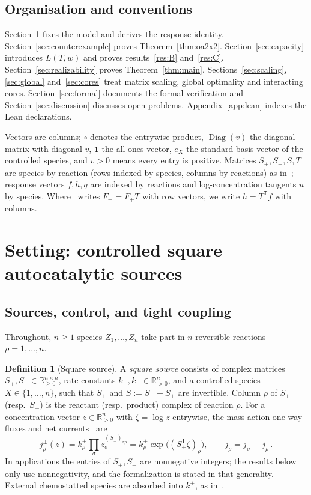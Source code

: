 \documentclass[11pt,reqno]{amsart}
\theoremstyle{plain}
\theoremstyle{definition}
\newtheorem{definition}[theorem]{Definition}
\theoremstyle{remark}
\numberwithin{equation}{section}
\newcommand{\R}{\mathbb{R}}
\newcommand{\one}{\mathbf{1}}
\newcommand{\Diag}{\operatorname{Diag}}
\newcommand{\Sp}{S_{+}}
\newcommand{\Sm}{S_{-}}
\newcommand{\T}{\mathsf{T}}
\renewcommand{\odot}{\circ}
\begin{document}
\subsection{Organisation and conventions}
Section~\ref{sec:setting} fixes the model and derives the response identity.  Section~\ref{sec:counterexample} proves Theorem~\ref{thm:oa2x2}.  Section~\ref{sec:capacity} introduces $L(T,w)$ and proves results~\ref{res:B} and~\ref{res:C}.  Section~\ref{sec:realizability} proves Theorem~\ref{thm:main}.  Sections~\ref{sec:scaling}, \ref{sec:global} and~\ref{sec:cores} treat matrix scaling, global optimality and interacting cores.  Section~\ref{sec:formal} documents the formal verification and Section~\ref{sec:discussion} discusses open problems.  Appendix~\ref{app:lean} indexes the Lean declarations.

Vectors are columns; $\odot$ denotes the entrywise product, $\Diag(v)$ the diagonal matrix with diagonal $v$, $\one$ the all-ones vector, $e_X$ the standard basis vector of the controlled species, and $v>0$ means every entry is positive.  Matrices $\Sp,\Sm,S,T$ are species-by-reaction (rows indexed by species, columns by reactions) as in~\cite{DDL24}; response vectors $f,h,q$ are indexed by reactions and log-concentration tangents $u$ by species.  Where~\cite{DDL24} writes $F_-=F_+T$ with row vectors, we write $h=T^{\T}f$ with columns.

\section{Setting: controlled square autocatalytic sources}\label{sec:setting}

\subsection{Sources, control, and tight coupling}
Throughout, $n\ge1$ species $Z_1,\dots,Z_n$ take part in $n$ reversible reactions $\rho=1,\dots,n$.

\begin{definition}[Square source]\label{def:source}
A \emph{square source} consists of complex matrices $\Sp,\Sm\in\R_{\ge0}^{n\times n}$, rate constants $k^+,k^-\in\R_{>0}^n$, and a controlled species $X\in\{1,\dots,n\}$, such that $\Sp$ and $S:=\Sm-\Sp$ are invertible.  Column $\rho$ of $\Sp$ (resp.\ $\Sm$) is the reactant (resp.\ product) complex of reaction $\rho$.  For a concentration vector $z\in\R^n_{>0}$ with $\zeta=\log z$ entrywise, the mass-action one-way fluxes and net currents~\cite{Fei19} are
\begin{equation}\label{eq:massaction}
j^\pm_\rho(z)=k^\pm_\rho\prod_\sigma z_\sigma^{(S_\pm)_{\sigma\rho}}=k^\pm_\rho\exp\big((S_\pm^{\T}\zeta)_\rho\big),\qquad j_\rho=j^+_\rho-j^-_\rho.
\end{equation}
In applications the entries of $\Sp,\Sm$ are nonnegative integers; the results below only use nonnegativity, and the formalization is stated in that generality.  External chemostatted species are absorbed into $k^\pm$, as in~\cite{DDL24}.
\end{definition}
\end{document}
